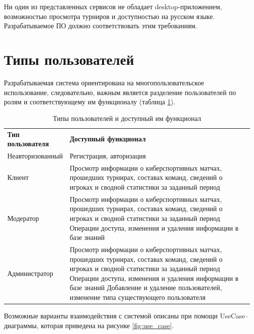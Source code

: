 Ни один из представленных сервисов не обладает desktop-приложением, возможностью просмотра турниров и доступностью на русском языке. Разрабатываемое ПО должно соответствовать этим требованиям.

\newpage

\section{Типы пользователей}

Разрабатываемая система ориентирована на многопользовательское использование, следовательно, важным является разделение пользователей по ролям и соответствующему им функционалу (таблица \ref{tabular:users_info}).

\begin{table}[h!]
	\centering
	\caption{\label{tabular:users_info}Типы пользователей и доступный им функционал}
	\begin{tabular}{|p{5 cm}|p{10 cm}|}
		\cline{1-2}
		\textbf{Тип пользователя}  & \textbf{Доступный функционал}                                                                           \\ \cline{1-2}
		Неавторизованный & Регистрация, авторизация \\ \cline{1-2}
		Клиент & Просмотр информации о киберспортивных матчах, прошедших турнирах, составах команд, сведений о игроках и сводной статистики за заданный период\\ \cline{1-2}
		Модератор & Просмотр информации о киберспортивных матчах, прошедших турнирах, составах команд, сведений о игроках и сводной статистики за заданный период
		\newline
		Операции доступа, изменения и удаления информации в базе знаний \\ \cline{1-2}
		Администратор & Просмотр информации о киберспортивных матчах, прошедших турнирах, составах команд, сведений о игроках и сводной статистики за заданный период
		\newline
		Операции доступа, изменения и удаления информации в базе знаний
		\newline 
		Добавление и удаление пользователей, изменение типа существующего пользователя \\ \cline{1-2}
	\end{tabular}%
\end{table}

Возможные варианты взаимодействия с системой описаны при помощи UseCase--диаграммы, которая приведена на рисунке \ref{fig:use_case}.

